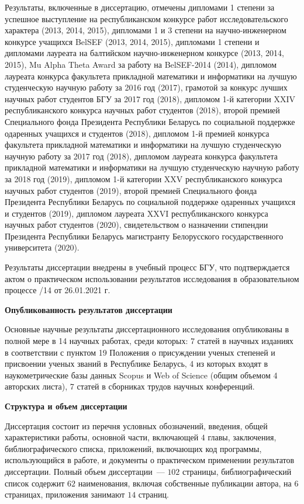 \documentclass[_00_autoref.tex]{subfiles}
\begin{document}
Результаты, включенные в диссертацию, отмечены
дипломами 1 степени за успешное выступление на республиканском конкурсе работ исследовательского характера (2013, 2014, 2015),
дипломами 1 и 3 степени на научно-инженерном конкурсе учащихся BelSEF (2013, 2014, 2015),
дипломами 1 степени и дипломами лауреата на балтийском научно-инженерном конкурсе (2013, 2014, 2015),
Mu Alpha Theta Award за работу на BelSEF-2014 (2014),
дипломом лауреата конкурса факультета прикладной математики и информатики на лучшую студенческую научную работу за 2016 год (2017),
грамотой за конкурс лучших научных работ студентов БГУ за 2017 год (2018),
дипломом 1-й категории XXIV республиканского конкурса научных работ студентов (2018),
второй премией Специального фонда Президента Республики Беларусь по социальной поддержке одаренных учащихся и студентов (2018),
дипломом 1-й премией конкурса факультета прикладной математики и информатики на лучшую студенческую научную работу за 2017 год (2018),
дипломом лауреата конкурса факультета прикладной математики и информатики на лучшую студенческую научную работу за 2018 год (2019),
дипломом 1-й категории XXV республиканского конкурса научных работ студентов (2019),
второй премией Специального фонда Президента Республики Беларусь по социальной поддержке одаренных учащихся и студентов (2019),
дипломом лауреата XXVI республиканского конкурса научных работ студентов (2020),
свидетельством о назначении стипендии Президента Республики Беларусь магистранту Белорусского государственного университета (2020).

Результаты диссертации внедрены в учебный процесс БГУ, что подтверждается актом о практическом использовании результатов исследования в образовательном процессе /14 от 26.01.2021 г.

\medskip
\centerline{\textbf{Опубликованность результатов диссертации}}

Основные научные результаты диссертационного исследования опубликованы в полной мере в 14 научных работах, среди которых: 7 статей в научных изданиях в соответствии с пунктом 19 Положения о присуждении ученых степеней и присвоении ученых званий в Республике Беларусь, 4 из которых входят в наукометрические базы данных Scopus и Web of Science (общим объемом 4 авторских листа), 7 статей в сборниках трудов научных конференций.

\medskip
\centerline{\textbf{Структура и объем диссертации}}

Диссертация состоит из перечня условных обозначений, введения, общей характеристики работы, основной части, включающей $4$ главы, заключения, библиографического списка, приложений, включающих код программы, использующийся в работе, и документы о практическом применении результатов диссертации.
Полный объем диссертации~--- $102$ страницы, библиографический список содержит $62$ наименования, включая собственные публикации автора, на $6$ страницах, приложения занимают $14$ страниц.
\end{document}
